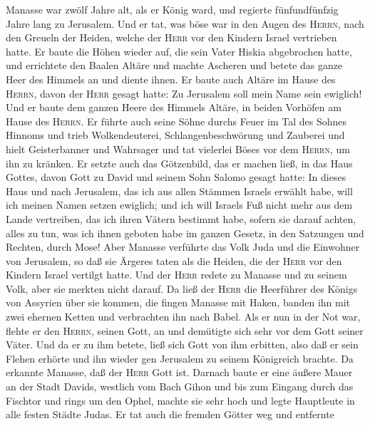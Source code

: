  Manasse war zwölf Jahre alt, als er König ward, und
regierte fünfundfünfzig Jahre lang zu Jerusalem.  Und er
tat, was böse war in den Augen des \textsc{Herrn}, nach den Greueln der
Heiden, welche der \textsc{Herr} vor den Kindern Israel vertrieben
hatte.  Er baute die Höhen wieder auf, die sein Vater
Hiskia abgebrochen hatte, und errichtete den Baalen Altäre und machte
Ascheren und betete das ganze Heer des Himmels an und diente ihnen.
 Er baute auch Altäre im Hause des \textsc{Herrn}, davon
der \textsc{Herr} gesagt hatte: Zu Jerusalem soll mein Name sein
ewiglich!  Und er baute dem ganzen Heere des Himmels
Altäre, in beiden Vorhöfen am Hause des \textsc{Herrn}. 
Er führte auch seine Söhne durchs Feuer im Tal des Sohnes Hinnoms und
trieb Wolkendeuterei, Schlangenbeschwörung und Zauberei und hielt
Geisterbanner und Wahrsager und tat vielerlei Böses vor dem
\textsc{Herrn}, um ihn zu kränken.  Er setzte auch das
Götzenbild, das er machen ließ, in das Haus Gottes, davon Gott zu David
und seinem Sohn Salomo gesagt hatte: In dieses Haus und nach Jerusalem,
das ich aus allen Stämmen Israels erwählt habe, will ich meinen Namen
setzen ewiglich;  und ich will Israels Fuß nicht mehr aus
dem Lande vertreiben, das ich ihren Vätern bestimmt habe, sofern sie
darauf achten, alles zu tun, was ich ihnen geboten habe im ganzen
Gesetz, in den Satzungen und Rechten, durch Mose!  Aber
Manasse verführte das Volk Juda und die Einwohner von Jerusalem, so daß
sie Ärgeres taten als die Heiden, die der \textsc{Herr} vor den Kindern
Israel vertilgt hatte.  Und der \textsc{Herr} redete zu
Manasse und zu seinem Volk, aber sie merkten nicht darauf.
 Da ließ der \textsc{Herr} die Heerführer des Königs von
Assyrien über sie kommen, die fingen Manasse mit Haken, banden ihn mit
zwei ehernen Ketten und verbrachten ihn nach Babel.  Als
er nun in der Not war, flehte er den \textsc{Herrn}, seinen Gott, an und
demütigte sich sehr vor dem Gott seiner Väter.  Und da er
zu ihm betete, ließ sich Gott von ihm erbitten, also daß er sein Flehen
erhörte und ihn wieder gen Jerusalem zu seinem Königreich brachte. Da
erkannte Manasse, daß der \textsc{Herr} Gott ist. 
Darnach baute er eine äußere Mauer an der Stadt Davids, westlich vom
Bach Gihon und bis zum Eingang durch das Fischtor und rings um den
Ophel, machte sie sehr hoch und legte Hauptleute in alle festen Städte
Judas.  Er tat auch die fremden Götter weg und entfernte
